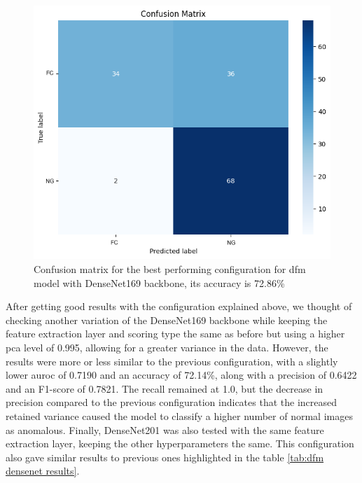 \begin{figure}[ht!]
    \centering
    \includegraphics[width=1\linewidth]{Rohit_Master_Thesis//Images/dfm_densenet_best_confusion_matrix.png}
    \caption{Confusion matrix for the best performing configuration for \gls{dfm} model with DenseNet169 backbone, its accuracy is 72.86\%}
    \label{fig:dfm densenet169 confusion matrix}
\end{figure}

\FloatBarrier

After getting good results with the configuration explained above, we thought of checking another variation of the DenseNet169 backbone while keeping the feature extraction layer and scoring type the same as before but using a higher \gls{pca} level of 0.995, allowing for a greater variance in the data. However, the results were more or less similar to the previous configuration, with a slightly lower \gls{auroc} of 0.7190 and an accuracy of 72.14\%, along with a precision of 0.6422 and an F1-score of 0.7821. The recall remained at 1.0, but the decrease in precision compared to the previous configuration indicates that the increased retained variance caused the model to classify a higher number of normal images as anomalous. Finally, DenseNet201 was also tested with the same feature extraction layer, keeping the other hyperparameters the same. This configuration also gave similar results to previous ones highlighted in the table \ref{tab:dfm densenet results}.



